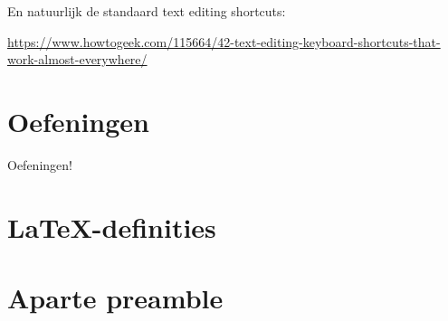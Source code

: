\documentclass[
    dutch,
    everyoneauthor=true,
    darktheme,
    defaultSlideCollection=vincent,
    handout
]{../../cursuspresentatie}
\let\placetarget\relax
\let\placetarget\relax
\begin{document}
\begin{frame}
    En natuurlijk de standaard text editing shortcuts:

    \url{https://www.howtogeek.com/115664/42-text-editing-keyboard-shortcuts-that-work-almost-everywhere/}
\end{frame}







\section{Oefeningen}

\def\placetarget{\hypertarget{oefeningen1}{}}

\begin{frame}
    \begin{center}
        {\LARGE Oefeningen!}
        \vspace{30pt}

        

    \end{center}
\end{frame}



\section{\LaTeX-definities}

\def\placetarget{\hypertarget{LaTeXDefinities}{}}


\section{Aparte preamble}

\def\placetarget{\hypertarget{apartePreamble}{}}
\end{document}
